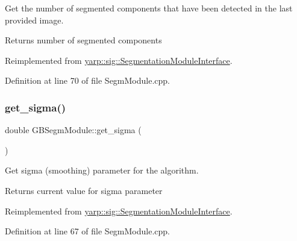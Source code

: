 Get the number of segmented components that have been detected in the last provided image. 

\begin{DoxyReturn}{Returns}
number of segmented components 
\end{DoxyReturn}


Reimplemented from \mbox{\hyperlink{classyarp_1_1sig_1_1SegmentationModuleInterface_a253cb5a4d4250b97842537b664a93064}{yarp\+::sig\+::\+Segmentation\+Module\+Interface}}.



Definition at line 70 of file Segm\+Module.\+cpp.


\begin{DoxyCode}{0}

\end{DoxyCode}
\mbox{\label{classGBSegmModule_ae32ae1b1461e19c3a1b2f429c729ed03}} 
\subsubsection{\texorpdfstring{get\_sigma()}{get\_sigma()}}
{\footnotesize\ttfamily double G\+B\+Segm\+Module\+::get\+\_\+sigma (\begin{DoxyParamCaption}{ }\end{DoxyParamCaption})\hspace{0.3cm}{\ttfamily [virtual]}}



Get sigma (smoothing) parameter for the algorithm. 

\begin{DoxyReturn}{Returns}
current value for sigma parameter 
\end{DoxyReturn}


Reimplemented from \mbox{\hyperlink{classyarp_1_1sig_1_1SegmentationModuleInterface_a38431f2c63d7da8ebf20adf0ed1da4fe}{yarp\+::sig\+::\+Segmentation\+Module\+Interface}}.



Definition at line 67 of file Segm\+Module.\+cpp.


\begin{DoxyCode}{0}

\end{DoxyCode}
\mbox{\label{classGBSegmModule_a15129913273e221a46c428f697e40575}} 
